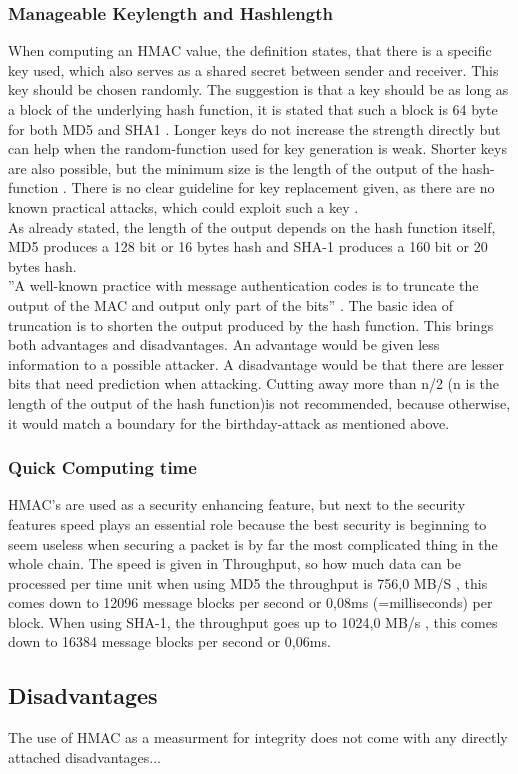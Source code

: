 \subsubsection{Manageable Keylength and Hashlength}
When computing an HMAC value, the definition states, that there is a specific key used, which also serves as a shared secret between sender and receiver. This key should be chosen randomly. The suggestion is that a key should be as long as a block of the underlying hash function, it is stated that such a block is 64 byte for both MD5 and SHA1 \cite{RFC}. Longer keys do not increase the strength directly but can help when the random-function used for key generation is weak. Shorter keys are also possible, but the minimum size is the length of the output of the hash-function \cite{RFC}. There is no clear guideline for key replacement given, as there are no known practical attacks, which could exploit such a key \cite{RFC}. \\
As already stated, the length of the output depends on the hash function itself, MD5 produces a 128 bit or 16 bytes hash and SHA-1 produces a 160 bit or 20 bytes hash. \\
''A well-known practice with message authentication codes is to truncate the output of the MAC and output only part of the bits'' \cite{RFC}. The basic idea of truncation is to shorten the output produced by the hash function. This brings both advantages and disadvantages. An advantage would be given less information to a possible attacker. A disadvantage would be that there are lesser bits that need prediction when attacking. Cutting away more than n/2 (n is the length of the output of the hash function)is not recommended, because otherwise, it would match a boundary for the birthday-attack as mentioned above. 
\subsubsection{Quick Computing time}
HMAC’s are used as a security enhancing feature, but next to the security features speed plays an essential role because the best security is beginning to seem useless when securing a packet is by far the most complicated thing in the whole chain. The speed is given in Throughput, so how much data can be processed per time unit when using MD5 the throughput is 756,0 MB/S \cite{MAX}, this comes down to 12096 message blocks per second or 0,08ms (=milliseconds) per block. When using SHA-1, the throughput goes up to 1024,0 MB/s \cite{MAX}, this comes down to 16384 message blocks per second or 0,06ms.

\subsection{Disadvantages}
The use of HMAC as a measurment for integrity does not come with any directly attached disadvantages...

